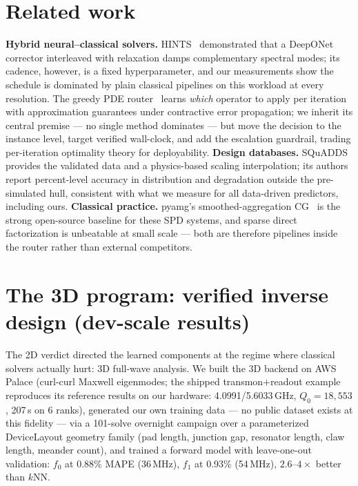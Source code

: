 \documentclass[11pt]{article}
\begin{document}
\section{Related work}

\textbf{Hybrid neural--classical solvers.} HINTS~\cite{hints} demonstrated
that a DeepONet corrector interleaved with relaxation damps complementary
spectral modes; its cadence, however, is a fixed hyperparameter, and our
measurements show the schedule is dominated by plain classical pipelines on
this workload at every resolution. The greedy PDE router~\cite{router} learns
\emph{which} operator to apply per iteration with approximation guarantees
under contractive error propagation; we inherit its central premise --- no
single method dominates --- but move the decision to the instance level,
target verified wall-clock, and add the escalation guardrail, trading
per-iteration optimality theory for deployability. \textbf{Design databases.}
SQuADDS~\cite{squadds} provides the validated data and a physics-based
scaling interpolation; its authors report percent-level accuracy in
distribution and degradation outside the pre-simulated hull, consistent with
what we measure for all data-driven predictors, including ours.
\textbf{Classical practice.} pyamg's smoothed-aggregation CG~\cite{pyamg} is
the strong open-source baseline for these SPD systems, and sparse direct
factorization is unbeatable at small scale --- both are therefore pipelines
inside the router rather than external competitors.

\section{The 3D program: verified inverse design (dev-scale results)}
\label{sec:3d}

The 2D verdict directed the learned components at the regime where classical
solvers actually hurt: 3D full-wave analysis. We built the 3D backend on AWS
Palace (curl-curl Maxwell eigenmodes; the shipped transmon+readout example
reproduces its reference results on our hardware: 4.0991/5.6033\,GHz,
$Q_0{=}18{,}553$, 207\,s on 6 ranks), generated our own training data --- no
public dataset exists at this fidelity --- via a 101-solve overnight campaign
over a parameterized DeviceLayout geometry family (pad length, junction gap,
resonator length, claw length, meander count), and trained a forward model
with leave-one-out validation: $f_0$ at 0.88\% MAPE (36\,MHz), $f_1$ at
0.93\% (54\,MHz), $2.6$--$4\times$ better than $k$NN.
\end{document}
